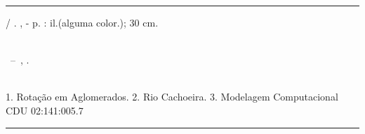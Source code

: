 \begin{fichacatalografica}
\vspace*{15cm} %
\hrule %
\begin{center} %
\begin{minipage}[c]{12.5cm} %
\imprimirautor
\hspace{0.5cm} \imprimirtitulo / \imprimirautor. 
\imprimirlocal, \imprimirdata-
\hspace{0.5cm} \pageref{LastPage} p. : il.(alguma color.); 30 cm.\\
\hspace{0.5cm} \imprimirorientadorRotulo \; \imprimirorientador\\
\hspace{0.5cm}
\parbox[t]{\textwidth}{\imprimirtipotrabalho~--~\imprimirinstituicao,
\imprimirdata.}\\
\hspace{0.5cm}
1. Rotação em Aglomerados.
2. Rio Cachoeira.
3. Modelagem Computacional
\hspace{8.75cm} CDU 02:141:005.7\\
\end{minipage}
\end{center}
\hrule
\end{fichacatalografica}